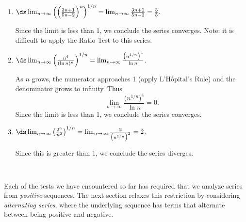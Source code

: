 {\begin{enumerate}
	\item $\ds\lim_{n\to\infty} \left(\left(\frac{3n+1}{5n-2}\right)^n\right)^{1/n} = \lim_{n\to\infty} \frac{3n+1}{5n-2} = \frac 35.$ 
	
	Since the limit is less than 1, we conclude the series converges. Note: it is difficult to apply the Ratio Test to this series.
	
	\item		$\ds\lim_{n\to\infty} \left(\frac{n^4}{(\ln n)^n}\right)^{1/n} = \lim_{n\to\infty} \frac {\big(n^{1/n}\big)^4}{\ln n}  $. 
	
	As $n$ grows, the numerator approaches 1 (apply L'H\^opital's Rule) and the denominator 
	grows to infinity.  Thus $$ \lim_{n\to\infty} \frac{\big(n^{1/n}\big)^4}{\ln n} = 0.$$ Since the limit is less than 1, we conclude the series converges.
	
	\item		$\ds \lim_{n\to\infty} \left(\frac{2^n}{n^2}\right)^{1/n} = \lim_{n\to\infty} \frac{2}{\big(n^{1/n}\big)^2} = 2$. 
	
	Since this is greater than 1, we conclude the series diverges.
\end{enumerate}
\baselineskip
}\\

Each of the tests we have encountered so far has required that we analyze series from \emph{positive} sequences. The next section relaxes this restriction by  considering \emph{alternating series}, where the underlying sequence has terms that alternate between being positive and negative.



